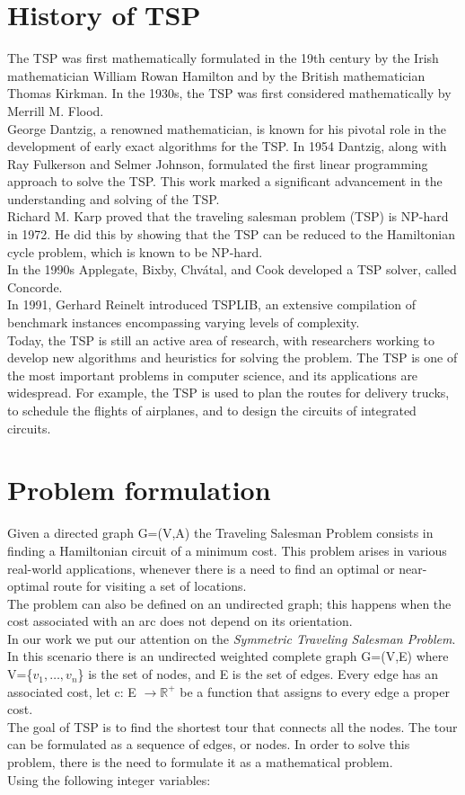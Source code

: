 \section{History of TSP}
The TSP was first mathematically formulated in the 19th century by the Irish mathematician William Rowan Hamilton and by the British mathematician Thomas Kirkman. In the 1930s, the TSP was first considered mathematically by Merrill M. Flood.\\
George Dantzig, a renowned mathematician, is known for his pivotal role in the development of early exact algorithms for the TSP. In 1954 Dantzig, along with Ray Fulkerson and Selmer Johnson, formulated the first linear programming approach to solve the TSP. This work marked a significant advancement in the understanding and solving of the TSP.\\
Richard M. Karp proved that the traveling salesman problem (TSP) is NP-hard in 1972. He did this by showing that the TSP can be reduced to the Hamiltonian cycle problem, which is known to be NP-hard.\\
In the 1990s  Applegate, Bixby, Chvátal, and Cook developed a TSP solver, called Concorde. \\
In 1991, Gerhard Reinelt introduced TSPLIB, an extensive compilation of benchmark instances encompassing varying levels of complexity.\\
Today, the TSP is still an active area of research, with researchers working to develop new algorithms and heuristics for solving the problem. The TSP is one of the most important problems in computer science, and its applications are widespread. For example, the TSP is used to plan the routes for delivery trucks, to schedule the flights of airplanes, and to design the circuits of integrated circuits.


\section{Problem formulation}

Given a directed graph G=(V,A) the Traveling Salesman Problem consists in finding a Hamiltonian circuit of a minimum cost. This problem arises in various real-world applications, whenever there is a need to find an optimal or near-optimal route for visiting a set of locations.\\
The problem can also be defined on an undirected graph; this happens when the cost associated with an arc does not depend on its orientation.\\ 
In our work we put our attention on the \textit{Symmetric Traveling Salesman Problem}. In this scenario there is an undirected weighted complete graph G=(V,E) where V=\{$v_1,\dotsc,v_n$\} is the set of nodes, and E is the set of edges. Every edge has an associated cost, let c: E $\rightarrow \mathbb{R}^+$ be a function that assigns to every edge a proper cost.\\
The goal of TSP is to find the shortest tour that connects all the nodes. The tour can be formulated as a sequence of edges, or nodes. In order to solve this problem, there is the need to formulate it as a mathematical problem.
\\Using the following integer variables:




